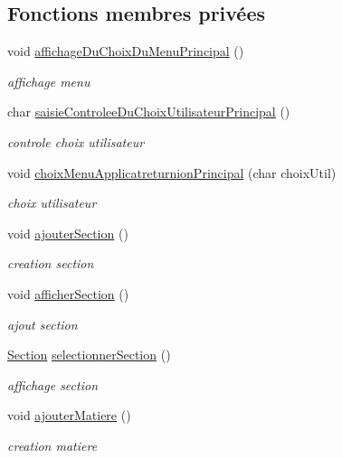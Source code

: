 \subsection*{Fonctions membres privées}
\begin{DoxyCompactItemize}
\item 
void \hyperlink{class_application_a533e3a2a4101cc999a090dda5c5aeb7b}{affichage\+Du\+Choix\+Du\+Menu\+Principal} ()
\begin{DoxyCompactList}\small\item\em affichage menu \end{DoxyCompactList}\item 
char \hyperlink{class_application_a78eac33e041505d8275b6e03e49e3752}{saisie\+Controlee\+Du\+Choix\+Utilisateur\+Principal} ()
\begin{DoxyCompactList}\small\item\em controle choix utilisateur \end{DoxyCompactList}\item 
void \hyperlink{class_application_a519be3b32f1831524e189f2e031dbb4d}{choix\+Menu\+Applicatreturnion\+Principal} (char choix\+Util)
\begin{DoxyCompactList}\small\item\em choix utilisateur \end{DoxyCompactList}\item 
void \hyperlink{class_application_a08280a27faf4c8dcae825cc2bf87845d}{ajouter\+Section} ()
\begin{DoxyCompactList}\small\item\em creation section \end{DoxyCompactList}\item 
void \hyperlink{class_application_a0096f4706fc9c1ede19b3c7a91673898}{afficher\+Section} ()
\begin{DoxyCompactList}\small\item\em ajout section \end{DoxyCompactList}\item 
\hyperlink{class_section}{Section} \hyperlink{class_application_a5d0c52ff4fbad254b929fa7379d64dab}{selectionner\+Section} ()
\begin{DoxyCompactList}\small\item\em affichage section \end{DoxyCompactList}\item 
void \hyperlink{class_application_aab7ab676955bd4dc68f1a2fbb59d405a}{ajouter\+Matiere} ()
\begin{DoxyCompactList}\small\item\em creation matiere \end{DoxyCompactList}\item 

\end{DoxyCompactItemize}
